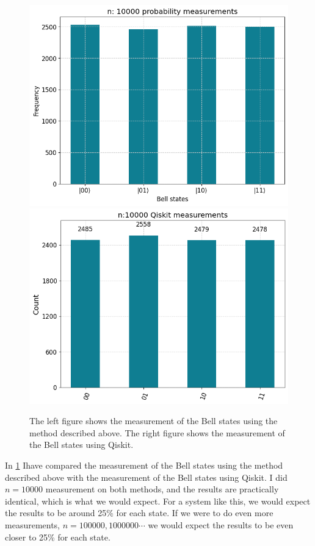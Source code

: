 \documentclass[11pt, letterpaper, titlepage]{article}
\begin{document}
\begin{figure}
        \begin{center}
                \includegraphics[scale=0.3]{BellMeasurement.png}
                \includegraphics[scale=0.3]{BellMeasurementQiskit.png}       
        \end{center}
        \caption{The left figure shows the measurement of the Bell states using the method described above. The right figure shows the measurement of the Bell states using Qiskit.}
        \label{fig:BellMeasurement}
\end{figure}
In \ref{fig:BellMeasurement} Ihave compared the measurement of the Bell states using the method described above with the measurement of the Bell states using Qiskit. I did \(n=10000\) measurement on both methods, and the results are practically identical, which is what we would expect. For a system like this, we would expect the results to be around 25\% for each state. If we were to do even more measurements, \(n = 100000,1000000\cdots   \) we would expect the results to be even closer to 25\% for each state. \newline
\end{document}
